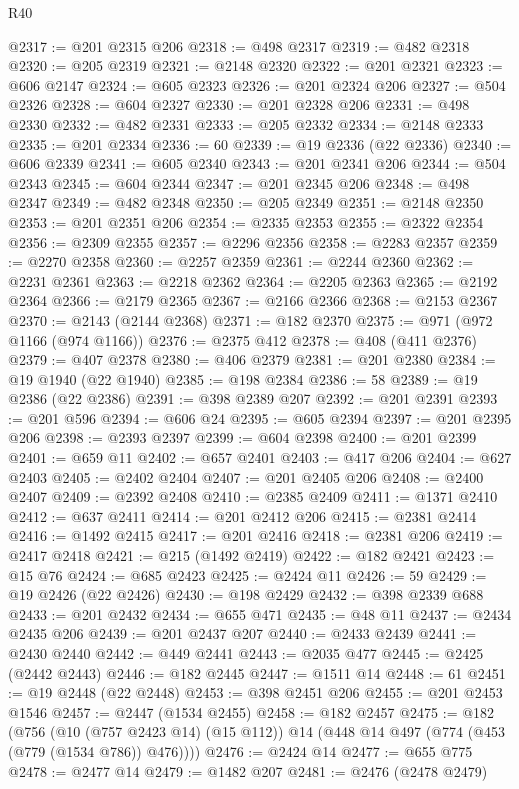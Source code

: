 \begin{lexlean}{R40}
\begin{coremodule}
@2317 := @201 @2315 @206
@2318 := @498 @2317
@2319 := @482 @2318
@2320 := @205 @2319
@2321 := @2148 @2320
@2322 := @201 @2321
@2323 := @606 @2147
@2324 := @605 @2323
@2326 := @201 @2324 @206
@2327 := @504 @2326
@2328 := @604 @2327
@2330 := @201 @2328 @206
@2331 := @498 @2330
@2332 := @482 @2331
@2333 := @205 @2332
@2334 := @2148 @2333
@2335 := @201 @2334
@2336 := 60
@2339 := @19 @2336 (@22 @2336)
@2340 := @606 @2339
@2341 := @605 @2340
@2343 := @201 @2341 @206
@2344 := @504 @2343
@2345 := @604 @2344
@2347 := @201 @2345 @206
@2348 := @498 @2347
@2349 := @482 @2348
@2350 := @205 @2349
@2351 := @2148 @2350
@2353 := @201 @2351 @206
@2354 := @2335 @2353
@2355 := @2322 @2354
@2356 := @2309 @2355
@2357 := @2296 @2356
@2358 := @2283 @2357
@2359 := @2270 @2358
@2360 := @2257 @2359
@2361 := @2244 @2360
@2362 := @2231 @2361
@2363 := @2218 @2362
@2364 := @2205 @2363
@2365 := @2192 @2364
@2366 := @2179 @2365
@2367 := @2166 @2366
@2368 := @2153 @2367
@2370 := @2143 (@2144 @2368)
@2371 := @182 @2370
@2375 := @971 (@972 @1166 (@974 @1166))
@2376 := @2375 @412
@2378 := @408 (@411 @2376)
@2379 := @407 @2378
@2380 := @406 @2379
@2381 := @201 @2380
@2384 := @19 @1940 (@22 @1940)
@2385 := @198 @2384
@2386 := 58
@2389 := @19 @2386 (@22 @2386)
@2391 := @398 @2389 @207
@2392 := @201 @2391
@2393 := @201 @596
@2394 := @606 @24
@2395 := @605 @2394
@2397 := @201 @2395 @206
@2398 := @2393 @2397
@2399 := @604 @2398
@2400 := @201 @2399
@2401 := @659 @11
@2402 := @657 @2401
@2403 := @417 @206
@2404 := @627 @2403
@2405 := @2402 @2404
@2407 := @201 @2405 @206
@2408 := @2400 @2407
@2409 := @2392 @2408
@2410 := @2385 @2409
@2411 := @1371 @2410
@2412 := @637 @2411
@2414 := @201 @2412 @206
@2415 := @2381 @2414
@2416 := @1492 @2415
@2417 := @201 @2416
@2418 := @2381 @206
@2419 := @2417 @2418
@2421 := @215 (@1492 @2419)
@2422 := @182 @2421
@2423 := @15 @76
@2424 := @685 @2423
@2425 := @2424 @11
@2426 := 59
@2429 := @19 @2426 (@22 @2426)
@2430 := @198 @2429
@2432 := @398 @2339 @688
@2433 := @201 @2432
@2434 := @655 @471
@2435 := @48 @11
@2437 := @2434 @2435 @206
@2439 := @201 @2437 @207
@2440 := @2433 @2439
@2441 := @2430 @2440
@2442 := @449 @2441
@2443 := @2035 @477
@2445 := @2425 (@2442 @2443)
@2446 := @182 @2445
@2447 := @1511 @14
@2448 := 61
@2451 := @19 @2448 (@22 @2448)
@2453 := @398 @2451 @206
@2455 := @201 @2453 @1546
@2457 := @2447 (@1534 @2455)
@2458 := @182 @2457
@2475 := @182
    (@756
      (@10 (@757 @2423 @14) (@15 @112))
      @14
      (@448 @14 @497 (@774 (@453 (@779 (@1534 @786)) @476))))
@2476 := @2424 @14
@2477 := @655 @775
@2478 := @2477 @14
@2479 := @1482 @207
@2481 := @2476 (@2478 @2479)

\end{coremodule}
\end{lexlean}
